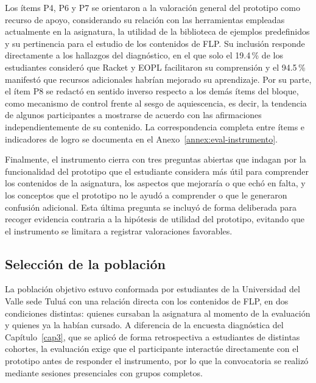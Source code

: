 Los ítems P4, P6 y P7 se orientaron a la valoración general del prototipo como recurso de apoyo, considerando su relación con las herramientas empleadas actualmente en la asignatura, la utilidad de la biblioteca de ejemplos predefinidos y su pertinencia para el estudio de los contenidos de FLP. Su inclusión responde directamente a los hallazgos del diagnóstico, en el que solo el 19.4\,\% de los estudiantes consideró que Racket y EOPL facilitaron su comprensión y el 94.5\,\% manifestó que recursos adicionales habrían mejorado su aprendizaje. Por su parte, el ítem P8 se redactó en sentido inverso respecto a los demás ítems del bloque, como mecanismo de control frente al sesgo de aquiescencia, es decir, la tendencia de algunos participantes a mostrarse de acuerdo con las afirmaciones independientemente de su contenido. La correspondencia completa entre ítems e indicadores de logro se documenta en el Anexo~\ref{annex:eval-instrumento}.

Finalmente, el instrumento cierra con tres preguntas abiertas que indagan por la funcionalidad del prototipo que el estudiante considera más útil para comprender los contenidos de la asignatura, los aspectos que mejoraría o que echó en falta, y los conceptos que el prototipo no le ayudó a comprender o que le generaron confusión adicional. Esta última pregunta se incluyó de forma deliberada para recoger evidencia contraria a la hipótesis de utilidad del prototipo, evitando que el instrumento se limitara a registrar valoraciones favorables.

\subsection{Selección de la población}

La población objetivo estuvo conformada por estudiantes de la Universidad del Valle sede Tuluá con una relación directa con los contenidos de FLP, en dos condiciones distintas: quienes cursaban la asignatura al momento de la evaluación y quienes ya la habían cursado. A diferencia de la encuesta diagnóstica del Capítulo~\ref{cap3}, que se aplicó de forma retrospectiva a estudiantes de distintas cohortes, la evaluación exige que el participante interactúe directamente con el prototipo antes de responder el instrumento, por lo que la convocatoria se realizó mediante sesiones presenciales con grupos completos.

